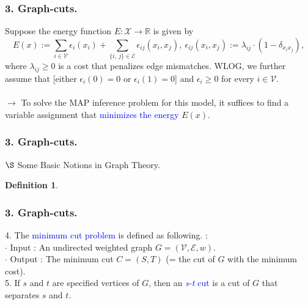 \documentclass[11pt]{beamer}
\newtheorem*{pf of lemma}{\it Proof of the \normalfont \bf Lemma}
\newtheorem*{pf of claim}{\it Proof of the \normalfont \sf Claim}
\newtheorem{defi}{Definition}[section]
\begin{document}
\begin{frame}
\frametitle{3. Graph-cuts.}
Suppose the energy function $E : \mathcal{X} \rightarrow \mathbb{R}$ is given by
$$E(x) :=\sum_{i \in \mathcal{V}} \epsilon_{i}(x_i) + \sum_{\{i,\ j\} \in \mathcal{E}} \epsilon_{ij}(x_i, x_j),\ \epsilon_{ij}(x_i, x_j) := \lambda_{ij} \cdot (1- \delta_{x_i x_j}),$$ where $\lambda_{ij} \geq 0$ is a cost that penalizes edge mismatches. WLOG, we further assume that [either $\epsilon_{i}(0) = 0$ or $\epsilon_{i}(1) = 0$] and $\epsilon_{i} \geq 0$ for every $i \in \mathcal{V}$. \\ \ \\
$\rightarrow$ To solve the MAP inference problem for this model, it suffices to find a variable assignment that \textcolor{blue}{minimizes the energy} $E(x)$.

\end{frame}

\begin{frame}
\frametitle{3. Graph-cuts.}
$\S$ Some Basic Notions in Graph Theory. \\

\begin{defi} 
\end{defi}
\end{frame}

\begin{frame}
\frametitle{3. Graph-cuts.}
4. The \textcolor{blue}{minimum cut problem} is defined as following. : \\
$\cdot$ Input : An undirected weighted graph $G = (\mathcal{V}, \mathcal{E}, w)$. \\
$\cdot$ Output : The minimum cut $C = (S, T)$ (= the cut of $G$ with the minimum cost). \\
5. If $s$ and $t$ are specified vertices of $G$, then an \textcolor{blue}{\textit{s-t} cut} is a cut of $G$ that separates $s$ and $t$. \\ \ \\


\end{frame}
\end{document}
